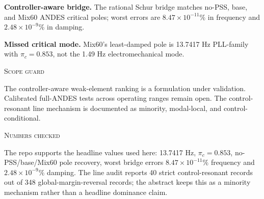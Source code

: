 \documentclass[conference]{IEEEtran}
\newcommand{\blocktitle}[1]{%
  \vspace{0.42em}%
  \noindent\centerline{\scshape #1}%
  \vspace{0.16em}%
}
\begin{document}
\noindent\textbf{Controller-aware bridge.} The rational Schur bridge matches no-PSS, base, and Mix60 ANDES critical poles; worst errors are \(8.47\times10^{-11}\%\) in frequency and \(2.48\times10^{-9}\%\) in damping.

\noindent\textbf{Missed critical mode.} Mix60's least-damped pole is 13.7417 Hz PLL-family with \(\pi_c=0.853\), not the 1.49 Hz electromechanical mode.

\blocktitle{Scope guard}
The controller-aware weak-element ranking is a formulation under validation. Calibrated full-ANDES tests across operating ranges remain open. The control-resonant line mechanism is documented as minority, modal-local, and control-conditional.

\blocktitle{Numbers checked}
The repo supports the headline values used here: 13.7417 Hz, \(\pi_c=0.853\), no-PSS/base/Mix60 pole recovery, worst bridge errors \(8.47\times10^{-11}\%\) frequency and \(2.48\times10^{-9}\%\) damping. The line audit reports 40 strict control-resonant records out of 348 global-margin-reversal records; the abstract keeps this as a minority mechanism rather than a headline dominance claim.
\end{document}
